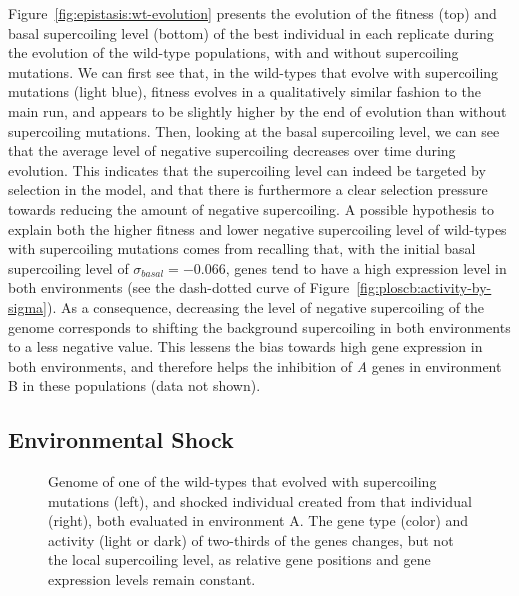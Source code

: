 Figure~\ref{fig:epistasis:wt-evolution} presents the evolution of the fitness (top) and basal supercoiling level (bottom) of the best individual in each replicate during the evolution of the wild-type populations, with and without supercoiling mutations.
We can first see that, in the wild-types that evolve with supercoiling mutations (light blue), fitness evolves in a qualitatively similar fashion to the main run, and appears to be slightly higher by the end of evolution than without supercoiling mutations.
Then, looking at the basal supercoiling level, we can see that the average level of negative supercoiling decreases over time during evolution.
This indicates that the supercoiling level can indeed be targeted by selection in the model, and that there is furthermore a clear selection pressure towards reducing the amount of negative supercoiling.
A possible hypothesis to explain both the higher fitness and lower negative supercoiling level of wild-types with supercoiling mutations comes from recalling that, with the initial basal supercoiling level of $\sigma_{basal} = -0.066$, genes tend to have a high expression level in both environments (see the dash-dotted curve of Figure~\ref{fig:ploscb:activity-by-sigma}).
As a consequence, decreasing the level of negative supercoiling of the genome corresponds to shifting the background supercoiling in both environments to a less negative value.
This lessens the bias towards high gene expression in both environments, and therefore helps the inhibition of \emph{A} genes in environment B in these populations (data not shown).

\subsection{Environmental Shock}

\begin{figure}
\centering
\begin{elasticrow}[width=\textwidth]
\end{elasticrow}
\caption[Evolved wild-type individual before and after an environmental shock]{Genome of one of the wild-types that evolved with supercoiling mutations (left), and shocked individual created from that individual (right), both evaluated in environment A.
The gene type (color) and activity (light or dark) of two-thirds of the genes changes, but not the local supercoiling level, as relative gene positions and gene expression levels remain constant.}
\label{fig:epistasis:shock}
\end{figure}

